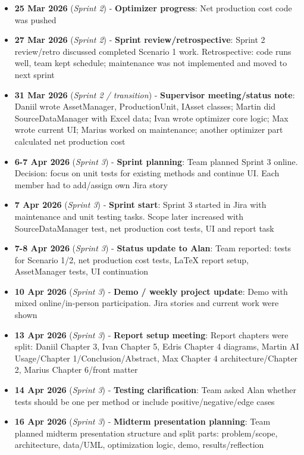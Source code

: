 \begin{itemize}[leftmargin=*,itemsep=0.5em]
\item \textbf{25 Mar 2026} (\textit{Sprint 2}) - \textbf{Optimizer progress}: Net production cost code was pushed
\item \textbf{27 Mar 2026} (\textit{Sprint 2}) - \textbf{Sprint review/retrospective}: Sprint 2 review/retro discussed completed Scenario 1 work. Retrospective: code runs well, team kept schedule; maintenance was not implemented and moved to next sprint
\item \textbf{31 Mar 2026} (\textit{Sprint 2 / transition}) - \textbf{Supervisor meeting/status note}: Daniil wrote AssetManager, ProductionUnit, IAsset classes; Martin did SourceDataManager with Excel data; Ivan wrote optimizer core logic; Max wrote current UI; Marius worked on maintenance; another optimizer part calculated net production cost
\item \textbf{6-7 Apr 2026} (\textit{Sprint 3}) - \textbf{Sprint planning}: Team planned Sprint 3 online. Decision: focus on unit tests for existing methods and continue UI. Each member had to add/assign own Jira story
\item \textbf{7 Apr 2026} (\textit{Sprint 3}) - \textbf{Sprint start}: Sprint 3 started in Jira with maintenance and unit testing tasks. Scope later increased with SourceDataManager test, net production cost tests, UI and report task
\item \textbf{7-8 Apr 2026} (\textit{Sprint 3}) - \textbf{Status update to Alan}: Team reported: tests for Scenario 1/2, net production cost tests, LaTeX report setup, AssetManager tests, UI continuation
\item \textbf{10 Apr 2026} (\textit{Sprint 3}) - \textbf{Demo / weekly project update}: Demo with mixed online/in-person participation. Jira stories and current work were shown
\item \textbf{13 Apr 2026} (\textit{Sprint 3}) - \textbf{Report setup meeting}: Report chapters were split: Daniil Chapter 3, Ivan Chapter 5, Edris Chapter 4 diagrams, Martin AI Usage/Chapter 1/Conclusion/Abstract, Max Chapter 4 architecture/Chapter 2, Marius Chapter 6/front matter
\item \textbf{14 Apr 2026} (\textit{Sprint 3}) - \textbf{Testing clarification}: Team asked Alan whether tests should be one per method or include positive/negative/edge cases
\item \textbf{16 Apr 2026} (\textit{Sprint 3}) - \textbf{Midterm presentation planning}: Team planned midterm presentation structure and split parts: problem/scope, architecture, data/UML, optimization logic, demo, results/reflection

\end{itemize}
